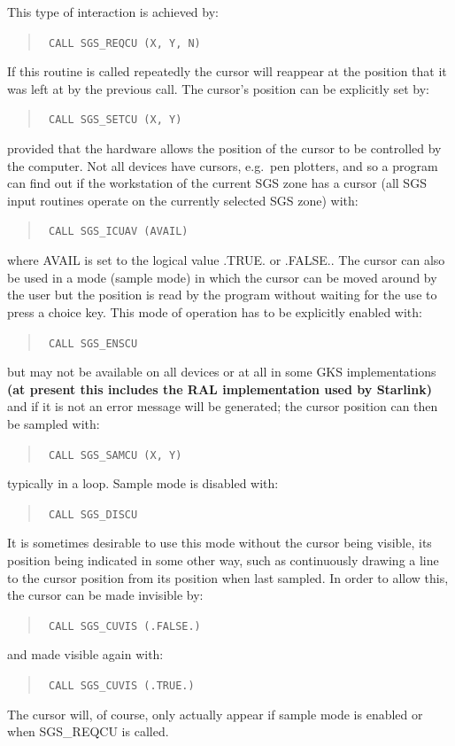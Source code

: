 \documentclass[11pt]{article}
\newcommand{\htmlref}[2]{#1}
\begin{document}
This type of interaction is achieved by:
\begin{quote}{\tt
    CALL \htmlref{SGS\_REQCU}{SGS_REQCU} (X, Y, N)}
\end{quote}
If
this routine is called repeatedly the cursor will reappear at the position
that it was left at by the previous call.  The
cursor's position can be explicitly
set by:
\begin{quote}{\tt
    CALL \htmlref{SGS\_SETCU}{SGS_SETCU} (X, Y)}
\end{quote}
provided that the hardware allows the position of the cursor to be controlled
by the computer.  Not all devices have cursors, e.g.\ pen plotters, and so a
program can find out if the workstation
of the current SGS zone has a cursor (all SGS
input routines operate on the currently selected SGS
zone) with:
\begin{quote}{\tt
    CALL \htmlref{SGS\_ICUAV}{SGS_ICUAV} (AVAIL)}
\end{quote}
where AVAIL is set to the logical value .TRUE.
or .FALSE..  The cursor can also
be used in a mode (sample mode) in which the cursor can be moved around by the
user but the position is read by the program without waiting for the use to
press a choice key.  This mode of operation has to be explicitly enabled with:
\begin{quote}{\tt
    CALL \htmlref{SGS\_ENSCU}{SGS_ENSCU}}
\end{quote}
but may not be available on all devices or at all in some GKS
implementations {\bf (at present this
includes the RAL implementation used by Starlink)} and if it is not
an error message will be generated;  the cursor position can
then be sampled with:
\begin{quote}{\tt
    CALL \htmlref{SGS\_SAMCU}{SGS_SAMCU} (X, Y)}
\end{quote}
typically in a loop.  Sample mode is disabled with:
\begin{quote}{\tt
    CALL \htmlref{SGS\_DISCU}{SGS_DISCU}}
\end{quote}
It is sometimes desirable to use this mode without the cursor being visible,
its position being indicated in some other way, such as continuously drawing a
line to the cursor position from its position when last
sampled.  In order to
allow this, the cursor can be made invisible by:
\begin{quote}{\tt
    CALL \htmlref{SGS\_CUVIS}{SGS_CUVIS} (.FALSE.)}
\end{quote}
and made visible again with:
\begin{quote}{\tt
    CALL SGS\_CUVIS (.TRUE.)}
\end{quote}
The cursor will, of course,
only actually appear if sample mode is enabled or
when SGS\_REQCU is called.
\end{document}
